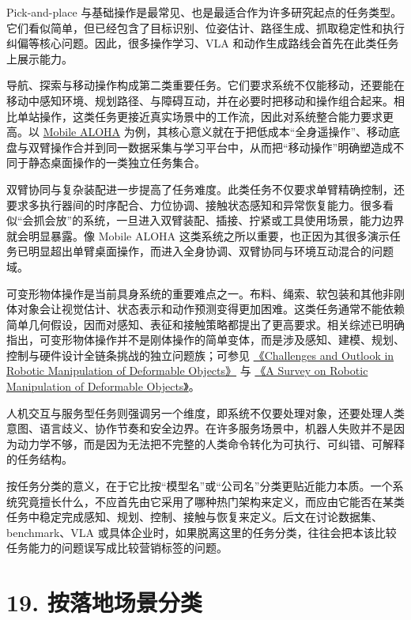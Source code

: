 Pick-and-place 与基础操作是最常见、也是最适合作为许多研究起点的任务类型。它们看似简单，但已经包含了目标识别、位姿估计、路径生成、抓取稳定性和执行纠偏等核心问题。因此，很多操作学习、VLA 和动作生成路线会首先在此类任务上展示能力。

导航、探索与移动操作构成第二类重要任务。它们要求系统不仅能移动，还要能在移动中感知环境、规划路径、与障碍互动，并在必要时把移动和操作组合起来。相比单站操作，这类任务更接近真实场景中的工作流，因此对系统整合能力要求更高。以 \href{https://arxiv.org/abs/2401.02117}{Mobile ALOHA} 为例，其核心意义就在于把低成本“全身遥操作”、移动底盘与双臂操作合并到同一数据采集与学习平台中，从而把“移动操作”明确塑造成不同于静态桌面操作的一类独立任务集合。

双臂协同与复杂装配进一步提高了任务难度。此类任务不仅要求单臂精确控制，还要求多执行器间的时序配合、力位协调、接触状态感知和异常恢复能力。很多看似“会抓会放”的系统，一旦进入双臂装配、插接、拧紧或工具使用场景，能力边界就会明显暴露。像 Mobile ALOHA 这类系统之所以重要，也正因为其很多演示任务已明显超出单臂桌面操作，而进入全身协调、双臂协同与环境互动混合的问题域。

可变形物体操作是当前具身系统的重要难点之一。布料、绳索、软包装和其他非刚体对象会让视觉估计、状态表示和动作预测变得更加困难。这类任务通常不能依赖简单几何假设，因而对感知、表征和接触策略都提出了更高要求。相关综述已明确指出，可变形物体操作并不是刚体操作的简单变体，而是涉及感知、建模、规划、控制与硬件设计全链条挑战的独立问题族；可参见 \href{https://arxiv.org/abs/2105.01767}{《Challenges and Outlook in Robotic Manipulation of Deformable Objects》} 与 \href{https://arxiv.org/abs/2312.10419}{《A Survey on Robotic Manipulation of Deformable Objects》}。

人机交互与服务型任务则强调另一个维度，即系统不仅要处理对象，还要处理人类意图、语言歧义、协作节奏和安全边界。在许多服务场景中，机器人失败并不是因为动力学不够，而是因为无法把不完整的人类命令转化为可执行、可纠错、可解释的任务结构。

按任务分类的意义，在于它比按“模型名”或“公司名”分类更贴近能力本质。一个系统究竟擅长什么，不应首先由它采用了哪种热门架构来定义，而应由它能否在某类任务中稳定完成感知、规划、控制、接触与恢复来定义。后文在讨论数据集、benchmark、VLA 或具体企业时，如果脱离这里的任务分类，往往会把本该比较任务能力的问题误写成比较营销标签的问题。

\section*{19. 按落地场景分类}

